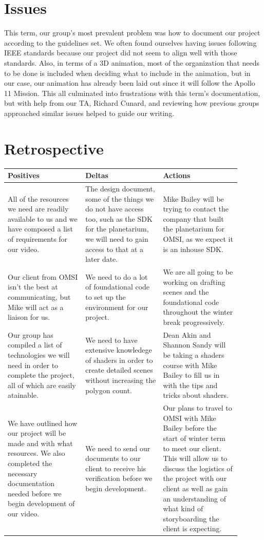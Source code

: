 \documentclass[onecolumn, draftclsnofoot,10pt, compsoc]{IEEEtran}
\begin{document}
\section{Issues}
This term, our group's most prevalent problem was how to document our project according to the guidelines set. We often found ourselves having issues following IEEE standards because our project did not seem to align well with those standards. Also, in terms of a 3D animation, most of the organization that needs to be done is included when deciding what to include in the animation, but in our case, our animation has already been laid out since it will follow the Apollo 11 Mission. This all culminated into frustrations with this term's documentation, but with help from our TA, Richard Cunard, and reviewing how previous groups approached similar issues helped to guide our writing. 

\section{Retrospective}

\begin{tabular}{|p{0.3\linewidth}|p{0.3\linewidth}|p{0.3\linewidth}|}
\hline
     Positives & Deltas & Actions  \\
    \hline
     All of the resources we need are readily available to us and we have composed a list of requirements for our video. & The design document, some of the things we do not have access too, such as the SDK for the planetarium, we will need to gain access to that at a later date. &Mike Bailey will be trying to contact the company that built the planetarium for OMSI, as we expect it is an inhouse SDK.\\ 
     \hline
     Our client from OMSI isn't the best at communicating, but Mike will act as a liaison for us.&We need to do a lot of foundational code to set up the environment for our project.&We are all going to be working on drafting scenes and the foundational code throughout the winter break progressively.\\
     \hline
     Our group has compiled a list of technologies we will need in order to complete the project, all of which are easily atainable.&We need to have extensive knowledege of shaders in order to create detailed scenes without increasing the polygon count.&Dean Akin and Shannon Sandy will be taking a shaders course with Mike Bailey to fill us in with the tips and tricks about shaders.\\
     \hline
     We have outlined how our project will be made and with what resources. We also completed the necessary documentation needed before we begin development of our video.&We need to send our documents to our client to receive his verification before we begin development.& Our plans to travel to OMSI with Mike Bailey before the start of winter term to meet our client. This will allow us to discuss the logistics of the project with our client as well as gain an understanding of what kind of storyboarding the client is expecting.\\
     \hline
     
\end{tabular}
\end{document}
